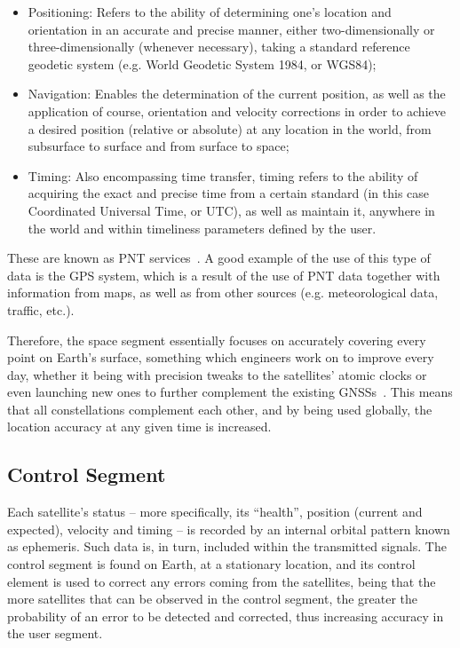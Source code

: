 \begin{itemize}
    \item Positioning: Refers to the ability of determining one's location and orientation in an accurate and precise manner, either two-dimensionally or three-dimensionally (whenever necessary), taking a standard reference geodetic system (e.g. World Geodetic System 1984, or WGS84);
    \item Navigation: Enables the determination of the current position, as well as the application of course, orientation and velocity corrections in order to achieve a desired position (relative or absolute) at any location in the world, from subsurface to surface and from surface to space;
    \item Timing: Also encompassing time transfer, timing refers to the ability of acquiring the exact and precise time from a certain standard (in this case Coordinated Universal Time, or UTC), as well as maintain it, anywhere in the world and within timeliness parameters defined by the user.
\end{itemize}
These are known as PNT services~\cite{pnt_2017}.
A good example of the use of this type of data is the GPS system, which is a result of the use of PNT data together with information from maps, as well as from other sources (e.g. meteorological data, traffic, etc.).

Therefore, the space segment essentially focuses on accurately covering every point on Earth's surface, something which engineers work on to improve every day, whether it being with precision tweaks to the satellites' atomic clocks or even launching new ones to further complement the existing GNSSs~\cite{euspa_news_2022}. This means that all constellations complement each other, and by being used globally, the location accuracy at any given time is increased.

\subsection{Control Segment}\label{sec:II_gnss_control_seg}

Each satellite's status -- more specifically, its ``health'', position (current and expected), velocity and timing -- is recorded by an internal orbital pattern known as \gls{ephemeris}. Such data is, in turn, included within the transmitted signals. The control segment is found on Earth, at a stationary location, and its control element is used to correct any errors coming from the satellites, being that the more satellites that can be observed in the control segment, the greater the probability of an error to be detected and corrected, thus increasing accuracy in the user segment.

